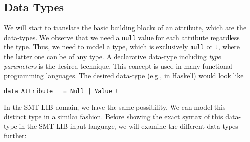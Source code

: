 \subsection*{Data Types}
We will start to translate the basic building blocks of an attribute, which are the data-types. We observe that we need a \verb|null| value for each attribute regardless the type. Thus, we need to model a type, which is exclusively \verb|null| or \verb|t|, where the latter one can be of any type. A declarative data-type including \emph{type parameters} is the desired technique. This concept is used in many functional programming languages. The desired data-type (e.g., in Haskell) would look like
\begin{verbatim}
data Attribute t = Null | Value t
\end{verbatim}
In the SMT-LIB domain, we have the same possibility. We can model this distinct type in a similar fashion. Before showing the exact syntax of this data-type in the SMT-LIB input language, we will examine the different data-types further:


